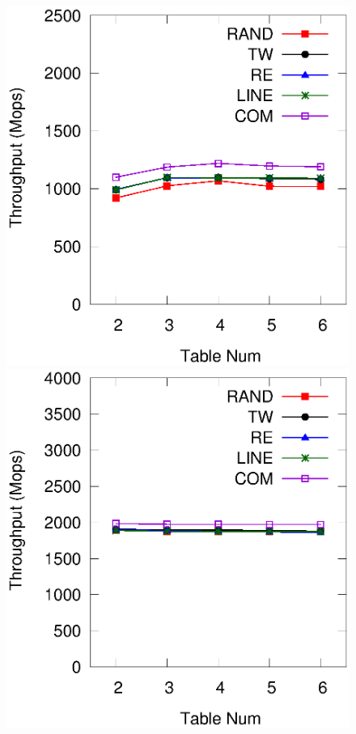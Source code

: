 \begin{figure}[t]
	\begin{minipage}{0.48\linewidth}\centering
		\includegraphics[width=\linewidth]{pic/tunning/tunning-insert.eps}
		\centerline{}
	\end{minipage}
	\hfill
	\begin{minipage}{0.48\linewidth}\centering
		\includegraphics[width=\linewidth]{pic/tunning/tunning-search.eps}
		\centerline{}
	\end{minipage}
	\caption{}
	\label{fig:vary-table}
\end{figure}
